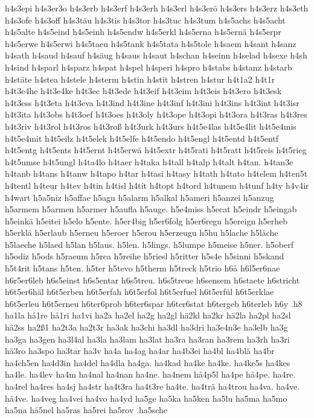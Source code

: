 h4s3epi
h4s3er3o
h4s3erb
h4s3erf
h4s3erh
h4s3erl
h4s3erö
h4s3ers
h4s3erz
h4s3eth
h4s3ofe
h4s3off
h4s3täu
h4s3tis
h4s3tor
h4s3tuc
h4s3tum
h4s5achs
h4s5acht
h4s5alte
h4s5eind
h4s5einh
h4s5endw
h4s5erkl
h4s5erna
h4s5ernä
h4s5erpr
h4s5erwe
h4s5erwi
h4s5taeu
h4s5tank
h4s5tata
h4s5tole
h4saem
h4sant
h4sanz
h4sath
h4saud
h4sauf
h4säug
h4saus
h4saut
h4schan
h4seinn
h4selad
h4sexe
h4sh
h4sind
h4sparl
h4sparz
h4spat
h4spel
h4speri
h4spro
h4stabs
h4stanz
h4starb
h4stäte
h4stea
h4stele
h4sterm
h4stin
h4stit
h4stren
h4stur
h4t1a2
h4t1r
h4t3e4he
h4t3e4ke
h4t3ec
h4t3ede
h4t3eif
h4t3eim
h4t3eis
h4t3ero
h4t3esk
h4t3ess
h4t3eta
h4t3eva
h4t3ind
h4t3ine
h4t3inf
h4t3ini
h4t3ins
h4t3int
h4t3isr
h4t3ita
h4t3obs
h4t3oef
h4t3oes
h4t3oly
h4t3ope
h4t3opi
h4t3ora
h4t3ras
h4t3res
h4t3riv
h4t3rol
h4t3ros
h4t3roß
h4t3urk
h4t3urs
h4t5e4las
h4t5e4lit
h4t5e4mis
h4t5e4mit
h4t5eilz
h4t5elek
h4t5elfe
h4t5endo
h4t5engl
h4t5entd
h4t5entf
h4t5entg
h4t5ents
h4t5ernt
h4t5erwä
h4t5extr
h4t5rati
h4t5ratt
h4t5reis
h4t5rieg
h4t5umse
h4t5ungl
h4ta4lo
h4taer
h4taka
h4tall
h4talp
h4talt
h4tan.
h4tan3e
h4tanb
h4tans
h4tanw
h4tapo
h4tar
h4tasi
h4tasy
h4tath
h4tato
h4telem
h4ten5t
h4tentl
h4teur
h4tev
h4tin
h4tisl
h4tít
h4topt
h4tord
h4tunem
h4tunf
h4ty
h4v4ir
h4wart
h5a5niz
h5affae
h5agu
h5alarm
h5alkal
h5ameri
h5anzei
h5anzug
h5armem
h5armen
h5armer
h5aufla
h5auge.
h5e4miss
h5ecat
h5eindr
h5eingab
h5einkä
h5eitei
h5elo
h5ente.
h5er4big
h5er6folg
h5er6regu
h5ereign
h5erheb
h5erklä
h5erlaub
h5erneu
h5eroer
h5erou
h5erzeugu
h5hu
h5lache
h5läche
h5laeche
h5laed
h5lan
h5laus.
h5len.
h5lings.
h5lumpe
h5meise
h5ner.
h5oberf
h5odiz
h5ods
h5raeum
h5rea
h5reihe
h5riesl
h5ritter
h5s4e
h5sinni
h5skand
h5t4rit
h5tans
h5ten.
h5ter
h5tevo
h5therm
h5treck
h5trio
h6å
h6l5er6nae
h6r5er6leb
h6s5einst
h6s5entar
h6s5treu.
h6s5treue
h6sensem
h6staete
h6stricht
h6t5er6häl
h6t5erben
h6t5erfah
h6t5erfol
h6t5erfuel
h6t5erfül
h6t5erklae
h6t5erleu
h6t5erneu
h6ter6prob
h6ter6spar
h6ter6stat
h6tergeb
h6terleb
h6y
.h8
ha1la
hå1re
hå1ri
ha1vi
ha2a
ha2el
ha2g
ha2gl
hä2kl
ha2kr
hä2la
ha2pl
ha2sl
hä2ss
ha2ß1
ha2t3a
ha2t3r
ha3ak
ha3chi
ha3dl
ha3dri
ha3e4n3e
ha3elb
ha3g
ha3ga
ha3gen
ha3l4al
ha3la
ha3lam
ha3lat
ha3ra
ha3ran
ha3rem
ha3rh
ha3ri
hä3ro
ha3spo
ha3tar
ha3v
ha4a
ha4ag
ha4ar
ha4b3ei
ha4bl
ha4blä
ha4br
ha4ch5en
ha4d3in
ha4del
ha4dla
ha4ga.
ha4kad
ha4ke
ha4ke.
ha4ke5s
ha4kes
ha4le.
ha4lev
ha4m
ha4nal
ha4nan
ha4ne.
ha4nem
hå4p5l
ha4pe
hå4pe.
ha4re.
ha4rel
ha4res
ha4sj
ha4str
ha4t3ra
ha4t3re
ha4te.
ha4trä
ha4trou
ha4va.
ha4ve.
hå4ve.
ha4veg
ha4vei
ha4vo
ha4yd
ha5ge
ha5ka
ha5ken
ha5lu
ha5ma
ha5mo
ha5na
hå5nel
ha5ras
ha5rei
ha5rov
.ha5sche
